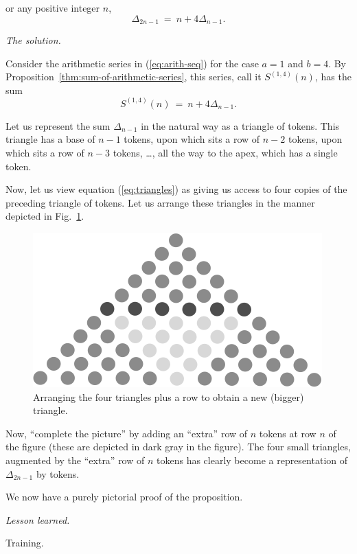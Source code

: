or any positive integer $n$,
\[ \Delta_{2n-1} \ = \ n + 4 \Delta_{n-1}. \]
\medskip

\noindent \textit{The solution.}

Consider the arithmetic series in (\ref{eq:arith-seq}) for the case
$a=1$ and $b=4$.  
By Proposition~\ref{thm:sum-of-arithmetic-series},
this series, call it $S^{(1,4)}(n)$, has the sum
\begin{equation}
\label{eq:triangles}
S^{(1,4)}(n) \ = \ n + 4 \Delta_{n-1}.
\end{equation}

Let us represent the sum $\Delta_{n-1}$ in the natural way as a
triangle of tokens.  This triangle has a base of $n-1$ tokens, upon
which sits a row of $n-2$ tokens, upon which sits a row of $n-3$
tokens, \ldots, all the way to the apex, which has a single token.

Now, let us view equation (\ref{eq:triangles}) as giving us access to four
copies of the preceding triangle of tokens.  Let us arrange these
triangles in the manner depicted in Fig.~\ref{fig:Delta(n)4}.
\begin{figure}[ht]
\begin{center}
       \includegraphics[scale=0.5]{FiguresMaths/Delta4}
 \caption{Arranging the four triangles plus a row to obtain a new (bigger) triangle.}
       \label{fig:Delta(n)4}
\end{center}
\end{figure}
Now, ``complete the picture'' by adding an ``extra'' row of $n$
tokens at row $n$ of the figure (these are depicted in dark gray in
the figure).  The four small triangles, augmented by the ``extra'' row
of $n$ tokens has clearly become a representation  of $\Delta_{2n-1}$
by tokens.

We now have a purely pictorial proof of the proposition. 
\medskip

\noindent \textit{Lesson learned.}

Training.



